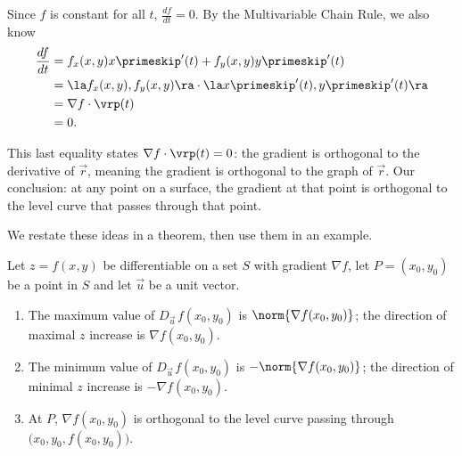 Since $f$ is constant for all $t$, $\frac{df}{dt} = 0$. By the Multivariable Chain Rule, we also know
\begin{align*}
\frac{df}{dt} &= f_x(x,y)x\primeskip'(t) + f_y(x,y)y\primeskip'(t)\\						
						&= \la f_x(x,y),f_y(x,y)\ra \cdot \la x\primeskip'(t),y\primeskip'(t)\ra\\
						&= \nabla f \cdot \vrp(t)\\
						&=0.
\end{align*}

This last equality states $\nabla f \cdot \vrp(t) = 0$: the gradient is orthogonal to the derivative of $\vec r$, meaning the gradient is orthogonal to the graph of $\vec r$. Our conclusion: at any point on a surface, the gradient at that point is orthogonal to the level curve that passes through that point.

We restate these ideas in a theorem, then use them in an example.
\enlargethispage{4\baselineskip}

{Let $z=f(x,y)$ be differentiable on a set $S$ with gradient $\nabla f$, let $P=(x_0,y_0)$ be a point in $S$ and let $\vec u$ be a unit vector.
\begin{enumerate}
	\item The maximum value of $D_{\vec u\,}f(x_0,y_0)$ is $\norm{\nabla f(x_0,y_0)}$; the direction of maximal $z$ increase is $\nabla f(x_0,y_0)$.
	\item   The minimum value of $D_{\vec u\,}f(x_0,y_0)$ is $-\norm{\nabla f(x_0,y_0)}$; the direction of minimal $z$ increase is $-\nabla f(x_0,y_0)$.
	\item At $P$, $\nabla f(x_0,y_0)$ is orthogonal to the level curve passing through $\big(x_0,y_0,f(x_0,y_0)\big)$.
\end{enumerate}
}


